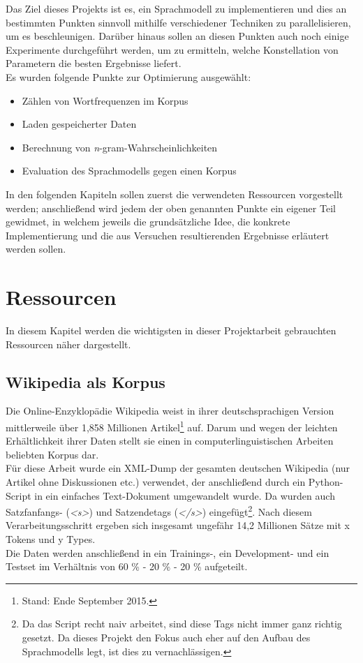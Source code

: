 \documentclass[a4paper,12pt]{scrartcl}
\begin{document}
    Das Ziel dieses Projekts ist es, ein Sprachmodell zu implementieren und dies an bestimmten Punkten sinnvoll mithilfe verschiedener Techniken zu parallelisieren, um es beschleunigen. Darüber hinaus sollen an diesen Punkten auch noch einige Experimente durchgeführt werden, um zu ermitteln, welche Konstellation von Parametern die besten Ergebnisse liefert. \\

    Es wurden folgende Punkte zur Optimierung ausgewählt:
    \begin{itemize}
        \item Zählen von Wortfrequenzen im Korpus
        \item Laden gespeicherter Daten
        \item Berechnung von \emph{n}-gram-Wahrscheinlichkeiten
        \item Evaluation des Sprachmodells gegen einen Korpus
    \end{itemize}

    In den folgenden Kapiteln sollen zuerst die verwendeten Ressourcen vorgestellt werden; anschließend wird jedem der oben genannten Punkte ein eigener Teil gewidmet, in welchem jeweils die grundsätzliche Idee, die konkrete Implementierung und die aus Versuchen resultierenden Ergebnisse erläutert werden sollen.

\section{Ressourcen}

    In diesem Kapitel werden die wichtigsten in dieser Projektarbeit gebrauchten Ressourcen näher dargestellt.

    \subsection{Wikipedia als Korpus}

    Die Online-Enzyklopädie Wikipedia weist in ihrer deutschsprachigen Version mittlerweile über 1,858 Millionen Artikel\footnote{Stand: Ende September 2015.} auf. Darum und wegen der leichten Erhältlichkeit ihrer Daten stellt sie einen in computerlinguistischen Arbeiten beliebten Korpus dar. \\
    Für diese Arbeit wurde ein XML-Dump der gesamten deutschen Wikipedia (nur Artikel ohne Diskussionen etc.) verwendet, der anschließend durch ein Python-Script in ein einfaches Text-Dokument umgewandelt wurde. Da wurden auch Satzfanfangs- (\emph{<s>}) und Satzendetags (\emph{</s>}) eingefügt\footnote{Da das Script recht naiv arbeitet, sind diese Tags nicht immer ganz richtig gesetzt. Da dieses Projekt den Fokus auch eher auf den Aufbau des Sprachmodells legt, ist dies zu vernachlässigen.}. Nach diesem Verarbeitungsschritt ergeben sich insgesamt ungefähr 14,2 Millionen Sätze mit x Tokens und y Types. \\
    Die Daten werden anschließend in ein Trainings-, ein Development- und ein Testset im Verhältnis von 60 \% - 20 \% - 20 \% aufgeteilt.
\end{document}
